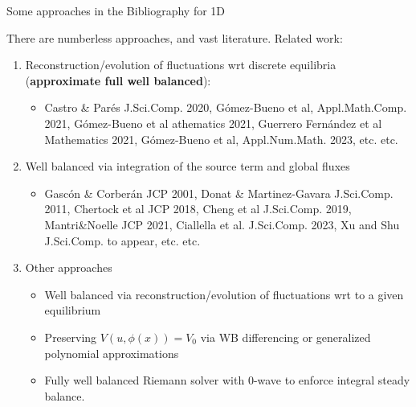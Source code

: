 \begin{frame}{Some approaches in the Bibliography  for 1D}
\MyLogoa

There are numberless approaches, and vast literature.
Related work:

\begin{enumerate}

\vspace{0.5cm}

\item Reconstruction/evolution of fluctuations wrt  discrete equilibria ({\bf approximate  full well balanced}):

\begin{itemize}
\item {\scriptsize    Castro \& Par\'es J.Sci.Comp. 2020,   G\'omez-Bueno et al, Appl.Math.Comp. 2021,   G\'omez-Bueno et al  athematics 2021,
Guerrero Fern\'andez et al  Mathematics 2021,   G\'omez-Bueno et al, Appl.Num.Math.  2023, etc. etc.}
\end{itemize}

\vspace{0.5cm}


\item Well balanced via integration of the source term and  global fluxes 

\begin{itemize}
\item {\scriptsize   Gasc\'on  \& Corber\'an  JCP 2001,  Donat \& Martinez-Gavara   J.Sci.Comp. 2011, 
Chertock et al JCP 2018, Cheng et al J.Sci.Comp. 2019, Mantri\&Noelle   JCP  2021,  
Ciallella et al.   J.Sci.Comp. 2023,   Xu and Shu J.Sci.Comp. to appear, etc. etc.} 
\end{itemize}

\vspace{0.5cm}


\item  Other approaches 

\begin{itemize}
\item Well balanced via reconstruction/evolution of fluctuations wrt to a given equilibrium
\item Preserving $V(u,\phi(x))=V_0$ via WB differencing or generalized polynomial approximations
\item Fully well balanced Riemann solver with 0-wave to enforce integral steady balance. 
\end{itemize}


\end{enumerate}


\end{frame}
 
 



